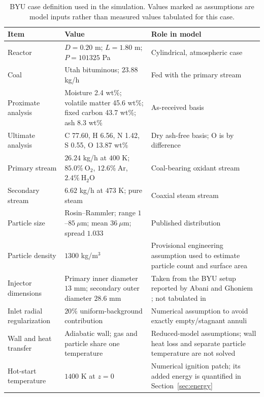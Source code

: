 \documentclass[journal]{IEEEtran}
\newcommand{\HtwoO}{\mathrm{H_2O}}
\newcommand{\Otwo}{\mathrm{O_2}}
\newcommand{\Ar}{\mathrm{Ar}}
\begin{document}
\begin{table}[t]
\caption{BYU case definition used in the simulation. Values marked as assumptions are model inputs rather than measured values tabulated for this case.}
\label{tab:case}
\centering
\small
\begin{tabularx}{\textwidth}{>{\raggedright\arraybackslash}p{} X >{\raggedright\arraybackslash}p{}}
\toprule
\textbf{Item} & \textbf{Value} & \textbf{Role in model} \\
\midrule
Reactor & \(D=0.20\) m; \(L=1.80\) m; \(P=101325\) Pa & Cylindrical, atmospheric case \cite{mularski2021} \\
Coal & Utah bituminous; \(23.88\) kg/h & Fed with the primary stream \cite{mularski2021} \\
Proximate analysis & Moisture 2.4 wt\%; volatile matter 45.6 wt\%; fixed carbon 43.7 wt\%; ash 8.3 wt\% & As-received basis \cite{mularski2021} \\
Ultimate analysis & C 77.60, H 6.56, N 1.42, S 0.55, O 13.87 wt\% & Dry ash-free basis; O is by difference \cite{mularski2021} \\
Primary stream & \(26.24\) kg/h at \(400\) K; \(85.0\%\ \Otwo\), \(12.6\%\ \Ar\), \(2.4\%\ \HtwoO\) & Coal-bearing oxidant stream \cite{mularski2021} \\
Secondary stream & \(6.62\) kg/h at \(473\) K; pure steam & Coaxial steam stream \cite{mularski2021} \\
Particle size & Rosin--Rammler; range \(1\)--\(85\ \mu\)m; mean \(36\ \mu\)m; spread \(1.033\) & Published distribution \cite{mularski2021} \\
Particle density & \(1300\) kg/m\(^3\) & Provisional engineering assumption used to estimate particle count and surface area \\
Injector dimensions & Primary inner diameter \(13\) mm; secondary outer diameter \(28.6\) mm & Taken from the BYU setup reported by Abani and Ghoniem \cite{abani2013}; not tabulated in \cite{mularski2021} \\
Inlet radial regularization & \(20\%\) uniform-background contribution & Numerical assumption to avoid exactly empty/stagnant annuli \\
Wall and heat transfer & Adiabatic wall; gas and particle share one temperature & Reduced-model assumptions; wall heat loss and separate particle temperature are not solved \\
Hot-start temperature & \(1400\) K at \(z=0\) & Numerical ignition patch; its added energy is quantified in Section~\ref{sec:energy} \\
\bottomrule
\end{tabularx}
\end{table}
\end{document}

